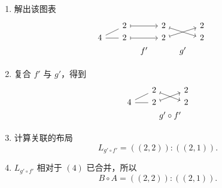 \begin{example}
\begin{enumerate}
\[\begin{tikzcd} [row sep = 1, column sep = 8]
        4 \ar[rr,mapsto] & & 4 \ar[-,rr] \ar[-,urr] & & 2 \ar[-,rr] & & 2 \ar[urr,mapsto] & & 2\\
        & f & & & & & & g & \\
        \end{tikzcd}
        \]
        \item 解出该图表
        \[
        \begin{tikzcd}[row sep = 1, column sep = 8]
        & &  2 \ar[rr,mapsto] & &  2 \ar[drr,mapsto ]& & 2 & & \\
        4 \ar[rr,-] \ar[urr,-] & & 2 \ar[rr,mapsto] & & 2 \ar[urr,mapsto] & & 2 & & \\
        & & & f' &  & g' & & & \\
        \end{tikzcd} \]
        \item 复合 $f'$ 与 $g'$，得到
        \[ \begin{tikzcd}[row sep = 1, column sep = 8]
        & & 2 \ar[drr,mapsto] & & 2\\
        4 \ar[rr,-] \ar[urr,-] & & 2 \ar[urr,mapsto] & & 2\\
        & & & \mathclap{g' \circ f'} &
        \end{tikzcd} \]
        \item 计算关联的布局
        \[
        L_{g' \circ f'} = ((2,2)):((2,1)).
        \]
        \item $L_{g' \circ f'}$ 相对于 $(4)$ 已合并，所以
        \[
        B \circ A = ((2,2)):((2,1)).
        \]
    \end{enumerate}
\end{example}







